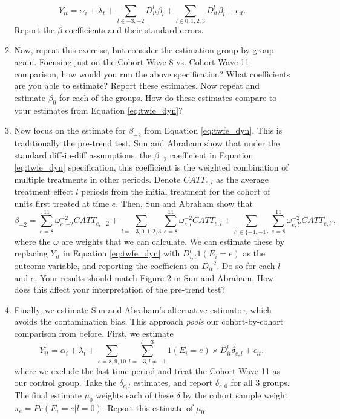 \documentclass[11pt, a4paper]{article}
\begin{document}
\begin{enumerate}
\begin{enumerate}
    \begin{equation}\label{eq:twfe_dyn}
      Y_{it} = \alpha_{i} + \lambda_{t} + \sum_{l \in -3,-2} D^{l}_{it}\beta_{l} +  \sum_{l \in 0,1,2,3} D^{l}_{it}\beta_{l} + \epsilon_{it}.
    \end{equation}
    Report the $\beta$ coefficients and their standard errors.
  \item Now, repeat this exercise, but consider the estimation
    group-by-group again. Focusing just on the Cohort Wave 8
    vs. Cohort Wave 11 comparison, how would you run the above
    specification? What coefficients are you able to estimate? Report
    these estimates. Now repeat and estimate $\beta_{0}$ for each of
    the groups. How do these estimates compare to your estimates from
    Equation \ref{eq:twfe_dyn}?
  \item Now focus on the estimate for $\beta_{-2}$ from Equation
    \ref{eq:twfe_dyn}. This is traditionally the pre-trend test. Sun
    and Abraham show that under the standard diff-in-diff assumptions,
    the $\beta_{-2}$ coefficient in Equation \ref{eq:twfe_dyn}
    specification, this coefficient is the weighted combination of
    multiple treatments in other periods. Denote $CATT_{e,l}$ as the
    average treatment effect $l$ periods from the initial treatment
    for the cohort of units first treated at time $e$. Then, Sun and Abraham show that
    \begin{equation}
      \beta_{-2} = \sum_{e=8}^{11}\omega_{e,-2}^{-2}CATT_{e,-2} + \sum_{l=-3,0,1,2,3}\sum_{e=8}^{11}\omega_{e,l}^{-2}CATT_{e,l} + \sum_{l'\in\{-4,-1\}}\sum_{e=8}^{11}\omega_{e,l'}^{-2}CATT_{e,l'}, 
    \end{equation}
    where the $\omega$ are weights that we can calculate. We can
    estimate these by replacing $Y_{it}$ in Equation \ref{eq:twfe_dyn}
    with $D_{i,t}^{l}1(E_{i}=e)$ as the outcome variable, and
    reporting the coefficient on $D^{-2}_{it}$. Do so for each $l$ and
    $e$. Your results should match Figure 2 in Sun and Abraham. How
    does this affect your interpretation of the pre-trend test?
  \item Finally, we estimate Sun and Abraham's alternative estimator,
    which avoids the contamination bias. This approach \emph{pools}
    our cohort-by-cohort comparison from before. First, we estimate
    \begin{equation}
      Y_{it} = \alpha_{i} + \lambda_{t} + \sum_{e = 8,9,10} \sum_{l =-3, l \not=-1}^{l=3} 1(E_{i} = e) \times D^{l}_{it}\delta_{e,l} + \epsilon_{it},
    \end{equation}
    where we exclude the last time period and treat the Cohort Wave 11
    as our control group. Take the $\delta_{e,l}$ estimates, and
    report $\delta_{e,0}$ for all 3 groups. The final estimate
    $\mu_{0}$ weights each of these $\delta$ by the cohort sample
    weight $\pi_{e} = Pr(E_{i} = e | l = 0)$. Report this estimate of
    $\mu_{0}$.
  \end{enumerate}
\end{enumerate}
\end{document}

